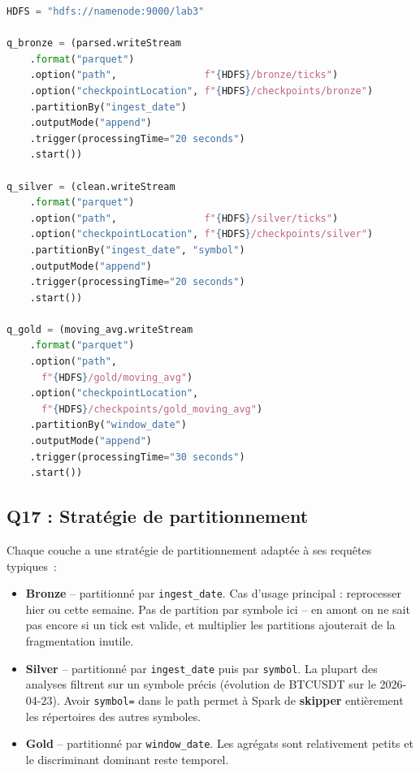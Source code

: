 \documentclass{RapportINPTCLOUD}
\begin{document}
\begin{lstlisting}[style=code, language=Python, caption=Les 3 writeStream vers HDFS]
HDFS = "hdfs://namenode:9000/lab3"

q_bronze = (parsed.writeStream
    .format("parquet")
    .option("path",               f"{HDFS}/bronze/ticks")
    .option("checkpointLocation", f"{HDFS}/checkpoints/bronze")
    .partitionBy("ingest_date")
    .outputMode("append")
    .trigger(processingTime="20 seconds")
    .start())

q_silver = (clean.writeStream
    .format("parquet")
    .option("path",               f"{HDFS}/silver/ticks")
    .option("checkpointLocation", f"{HDFS}/checkpoints/silver")
    .partitionBy("ingest_date", "symbol")
    .outputMode("append")
    .trigger(processingTime="20 seconds")
    .start())

q_gold = (moving_avg.writeStream
    .format("parquet")
    .option("path",
      f"{HDFS}/gold/moving_avg")
    .option("checkpointLocation",
      f"{HDFS}/checkpoints/gold_moving_avg")
    .partitionBy("window_date")
    .outputMode("append")
    .trigger(processingTime="30 seconds")
    .start())
\end{lstlisting}

\subsection{Q17 : Strat\'{e}gie de partitionnement}

Chaque couche a une strat\'{e}gie de partitionnement adapt\'{e}e \`{a} ses requ\^{e}tes typiques~:

\begin{itemize}[leftmargin=2em]
    \item \textbf{Bronze} -- partitionn\'{e} par \texttt{ingest\_date}. Cas d'usage principal : reprocesser \og hier\fg{} ou \og cette semaine\fg{}. Pas de partition par symbole ici -- en amont on ne sait pas encore si un tick est valide, et multiplier les partitions ajouterait de la fragmentation inutile.
    \item \textbf{Silver} -- partitionn\'{e} par \texttt{ingest\_date} puis par \texttt{symbol}. La plupart des analyses filtrent sur un symbole pr\'{e}cis (\og \'{e}volution de BTCUSDT sur le 2026-04-23\fg{}). Avoir \texttt{symbol=} dans le path permet \`{a} Spark de \textbf{skipper} enti\`{e}rement les r\'{e}pertoires des autres symboles.
    \item \textbf{Gold} -- partitionn\'{e} par \texttt{window\_date}. Les agr\'{e}gats sont relativement petits et le discriminant dominant reste temporel.
\end{itemize}
\end{document}
